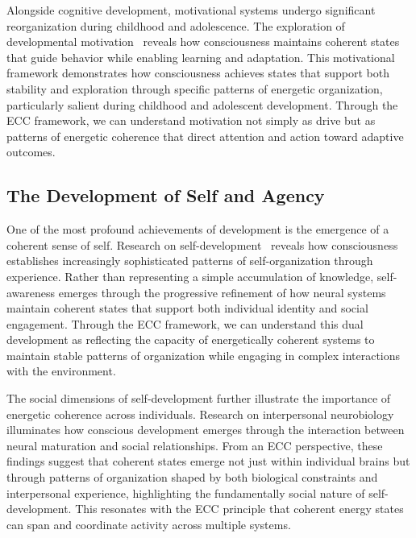 Alongside cognitive development, motivational systems undergo significant reorganization during childhood and adolescence. The exploration of developmental motivation~\cite{Kagan2013, butlin2023consciousnessartificialintelligenceinsights} reveals how consciousness maintains coherent states that guide behavior while enabling learning and adaptation. This motivational framework demonstrates how consciousness achieves states that support both stability and exploration through specific patterns of energetic organization, particularly salient during childhood and adolescent development. Through the ECC framework, we can understand motivation not simply as drive but as patterns of energetic coherence that direct attention and action toward adaptive outcomes.

\subsection*{The Development of Self and Agency}

One of the most profound achievements of development is the emergence of a coherent sense of self. Research on self-development~\cite{Damasio2010, zheng2025unbearable, Lichtenberg2016, kukushkin2024massed} reveals how consciousness establishes increasingly sophisticated patterns of self-organization through experience. Rather than representing a simple accumulation of knowledge, self-awareness emerges through the progressive refinement of how neural systems maintain coherent states that support both individual identity and social engagement. Through the ECC framework, we can understand this dual development as reflecting the capacity of energetically coherent systems to maintain stable patterns of organization while engaging in complex interactions with the environment.

The social dimensions of self-development further illustrate the importance of energetic coherence across individuals. Research on interpersonal neurobiology~\cite{Siegel2020, amil2024theta} illuminates how conscious development emerges through the interaction between neural maturation and social relationships. From an ECC perspective, these findings suggest that coherent states emerge not just within individual brains but through patterns of organization shaped by both biological constraints and interpersonal experience, highlighting the fundamentally social nature of self-development. This resonates with the ECC principle that coherent energy states can span and coordinate activity across multiple systems.

